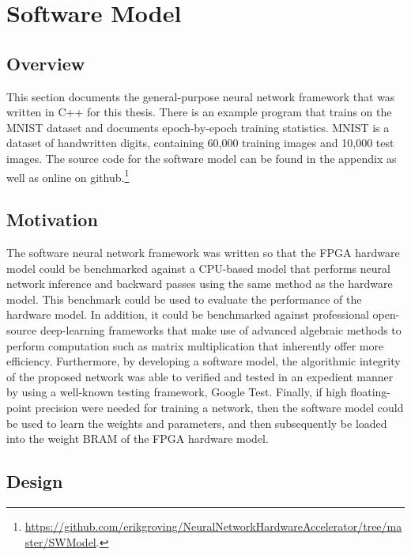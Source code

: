 \chapter{Software Model}
\section{Overview}
This section documents the general-purpose neural network framework that was written in C++ for this thesis. There is an example program that trains on the MNIST dataset and documents epoch-by-epoch training statistics. MNIST is a dataset of handwritten digits, containing 60,000 training images and 10,000 test images. The source code for the software model can be found in the appendix as well as online on github.\footnote{\url{
https://github.com/erikgroving/NeuralNetworkHardwareAccelerator/tree/master/SWModel}.}


\section{Motivation}
The software neural network framework was written so that the FPGA hardware model could be benchmarked against a CPU-based model that performs neural network inference and backward passes using the same method as the hardware model. This benchmark could be used to evaluate the performance of the hardware model. In addition, it could be benchmarked against professional open-source deep-learning frameworks that make use of advanced algebraic methods to perform computation such as matrix multiplication that inherently offer more efficiency. Furthermore, by developing a software model, the algorithmic integrity of the proposed network was able to verified and tested in an expedient manner by using a well-known testing framework, Google Test. Finally, if high floating-point precision were needed for training a network, then the software model could be used to learn the weights and parameters, and then subsequently be loaded into the weight BRAM of the FPGA hardware model.

\section{Design}

